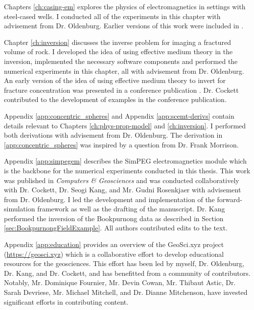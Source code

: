 Chapters \ref{ch:casing-em} explores the physics of electromagnetics in settings with steel-cased wells. I conducted all of the experiments in this chapter with advisement from Dr. Oldenburg. Earlier versions of this work were included in \citep{Heagy2015, Heagy2017a}.

Chapter \ref{ch:inversion} discusses the inverse problem for imaging a fractured volume of rock. I developed the idea of using effective medium theory in the inversion, implemented the necessary software components and performed the numerical experiments in this chapter, all with advisement from Dr. Oldenburg. An early version of the idea of using effective medium theory to invert for fracture concentration was presented in a conference publication \citep{Heagy2014a}. Dr. Cockett contributed to the development of examples in the conference publication.

Appendix \ref{app:concentric_spheres} and Appendix \ref{app:scemt-derivs} contain details relevant to Chapters \ref{ch:phys-prop-model} and \ref{ch:inversion}. I performed both derivations with advisement from Dr. Oldenburg. The derivation in \ref{app:concentric_spheres} was inspired by a question from Dr. Frank Morrison.

Appendix \ref{app:simpegem} describes the SimPEG electromagnetics module which is the backbone for the numerical experiments conducted in this thesis. This work was published in \emph{Computers \& Geosciences} \citep{Heagy2017} and was conducted collaboratively with Dr. Cockett, Dr. Seogi Kang, and Mr. Gudni Rosenkjaer with advisement from Dr. Oldenburg. I led the development and implementation of the forward-simulation framework as well as the drafting of the manuscript. Dr. Kang performed the inversion of the Bookpurnong data as described in Section \ref{sec:BookpurnongFieldExample}. All authors contributed edits to the text.

Appendix \ref{app:education} provides an overview of the GeoSci.xyz project (\href{https://geosci.xyz}{https://geosci.xyz}) which is a collaborative effort to develop educational resources for the geosciences. This effort has been led by myself, Dr. Oldenburg, Dr. Kang, and Dr. Cockett, and has benefitted from a community of contributors. Notably, Mr. Dominique Fournier, Mr. Devin Cowan, Mr. Thibaut Astic, Dr. Sarah Devriese, Mr. Michael Mitchell, and Dr. Dianne Mitchenson, have invested significant efforts in contributing content.

